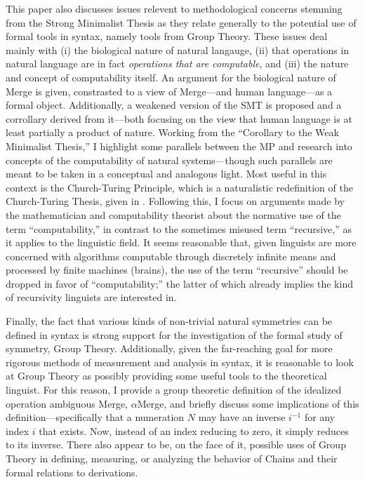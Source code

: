 \documentclass[11pt,twoside]{article}
\theoremstyle{plain}
\numberwithin{equation}{section}
\theoremstyle{definition}
\newtheorem{phrase string}{Phrase String}
\begin{document}
This paper also discusses issues relevent to methodological concerns stemming from the Strong Minimalist Thesis as they relate generally to the potential use of formal tools in syntax, namely tools from Group Theory. These issues deal mainly with (i) the biological nature of natural langauge, (ii) that operations in natural language are in fact \textsl{operations that are computable}, and (iii) the nature and concept of computability itself. An argument for the biological nature of Merge is given, constrasted to a view of Merge---and human language---as a formal object. Additionally, a weakened version of the SMT is proposed and a corrollary derived from it---both focusing on the view that human language is at least partially a product of nature. Working from the ``Corollary to the Weak Minimalist Thesis,'' I highlight some parallels between the MP and research into concepts of the computability of natural systems---though such parallels are meant to be taken in a conceptual and analogous light. Most useful in this context is the Church-Turing Principle, which is a naturalistic redefinition of the Church-Turing Thesis, given in \cite{deutsch:1985}. Following this, I focus on arguments made by the mathematician and computability theorist \cite{soare:1996,soare:2007,soare:2008} about the normative use of the term ``computability,'' in contrast to the sometimes misused term ``recursive,'' as it applies to the linguistic field. It seems reasonable that, given linguists are more concerned with algorithms computable through discretely infinite means and processed by finite machines (brains), the use of the term ``recursive'' should be dropped in favor of ``computability;'' the latter of which already implies the kind of recursivity linguists are interested in.

Finally, the fact that various kinds of non-trivial natural symmetries can be defined in syntax is strong support for the investigation of the formal study of symmetry, Group Theory. Additionally, given the far-reaching goal for more rigorous methods of measurement and analysis in syntax, it is reasonable to look at Group Theory as possibly providing some useful tools to the theoretical linguist. For this reason, I provide a group theoretic definition of the idealized operation ambiguous Merge, $\alpha$Merge, and briefly discuss some implications of this definition---specifically that a numeration $N$ may have an inverse $i^{-1}$ for any index $i$ that exists. Now, instead of an index reducing to zero, it simply reduces to its inverse. There also appear to be, on the face of it, possible uses of Group Theory in defining, measuring, or analyzing the behavior of Chains and their formal relations to derivations. 
   



\end{document}
